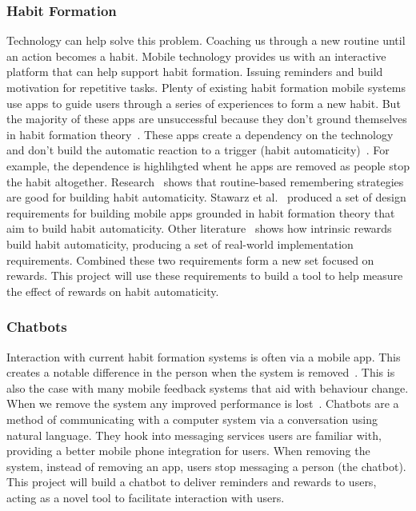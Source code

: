 \subsubsection*{Habit Formation}
Technology can help solve this problem. Coaching us through a new routine until an action becomes a habit.
Mobile technology provides us with an interactive platform that can help support habit formation. Issuing reminders and build motivation for repetitive tasks.
Plenty of existing habit formation mobile systems use apps to guide users through a series of experiences to form a new habit.
But the majority of these apps are unsuccessful because they don't ground themselves in habit formation theory~\cite{article_beyond_self_tracking_designing_apps, article_apps_of_steel}.
These apps create a dependency on the technology and don't build the automatic reaction to a trigger (habit automaticity)~\cite{article_dont_kick_habit}.
For example, the dependence is highlihgted whent he apps are removed as people stop the habit altogether.\newline
\newline
Research~\cite{article_understanding_use_contextual_cues_design_impl} shows that routine-based remembering strategies are good for building habit automaticity.
Stawarz et al.~\cite{article_dont_forget_your_pill} produced a set of design requirements for building mobile apps grounded in habit formation theory that aim to build habit automaticity.
Other literature~\cite{article_taxonomy_motivational_affordances_meaningful} shows how intrinsic rewards build habit automaticity, producing a set of real-world implementation requirements.
Combined these two requirements form a new set focused on rewards. This project will use these requirements to build a tool to help measure the effect of rewards on habit automaticity.

\subsubsection*{Chatbots}
Interaction with current habit formation systems is often via a mobile app. This creates a notable difference in the person when the system is removed~\cite{article_my_phone_is_part_of_my_soul}.
This is also the case with many mobile feedback systems that aid with behaviour change.
When we remove the system any improved performance is lost~\cite{article_dont_kick_habit, article_realtime_feedback_improving_medication_taking}.\newline
\newline
Chatbots are a method of communicating with a computer system via a conversation using natural language.
They hook into messaging services users are familiar with, providing a better mobile phone integration for users.
When removing the system, instead of removing an app, users stop messaging a person (the chatbot).
This project will build a chatbot to deliver reminders and rewards to users, acting as a novel tool to facilitate interaction with users.

